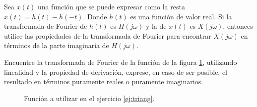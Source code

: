 \begin{ejercicio}
    Sea $x(t)$ una función que se puede expresar como la resta $x(t)=h(t)-h(-t)$. Donde $h(t)$ es una función de valor real. Si la transformada de Fourier de $h(t)$ es $H(j\omega)$ y la de $x(t)$ es $X(j\omega)$, entonces utilice las propiedades de la transformada de Fourier para encontrar $X(j\omega)$ en términos de la parte imaginaria de $H(j\omega)$.
\end{ejercicio}

\begin{ejercicio}
    \label{ej:triang}
    Encuentre la transformada de Fourier de la función de la figura \ref{fig:triang}, utilizando linealidad y la propiedad de derivación, exprese, en caso de ser posible, el resultado en términos puramente reales o puramente imaginarios.
    \begin{figure}[!h]
        \centering
        
        \caption{Función a utilizar en el ejercicio \ref{ej:triang}.}
        \label{fig:triang}
    \end{figure}
\end{ejercicio}


